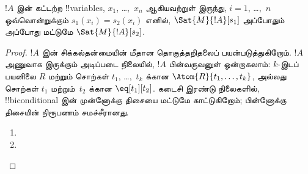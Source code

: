 \documentclass[../../../include/open-logic-section]{subfiles}
\begin{document}
\begin{prop}
$!A$ இன் கட்டற்ற !!{variable}s, $x_1$, \dots,~$x_n$ ஆகியவற்றுள்
இருந்து, $i = 1$, \dots,~$n$ ஒவ்வொன்றுக்கும்
$s_1(x_i) = s_2(x_i)$ எனில், $\Sat{M}{!A}[s_1]$
அப்போதும் அப்போது மட்டுமே $\Sat{M}{!A}[s_2]$.
\end{prop}

\begin{proof}
$!A$ இன் சிக்கல்தன்மையின் மீதான தொகுத்தறிதலைப் பயன்படுத்துகிறோம்.
$!A$ அணுவாக இருக்கும் அடிப்படை நிலையில், $!A$ பின்வருவனுள் ஒன்றாகலாம்:
$k$-இடப் பயனிலை $R$ மற்றும் சொற்கள் $t_1$, \dots,~$t_k$ க்கான
$\Atom{R}{t_1, \dots, t_k}$, அல்லது சொற்கள் $t_1$ மற்றும்~$t_2$
க்கான $\eq[t_1][t_2]$. கடைசி இரண்டு நிலைகளில், !!{biconditional} இன்
முன்னோக்கு திசையை மட்டுமே காட்டுகிறோம்; பின்னோக்கு திசையின் நிரூபணம்
சமச்சீரானது.

\begin{enumerate}


\item
\item
\end{enumerate}


\end{proof}
\end{document}
